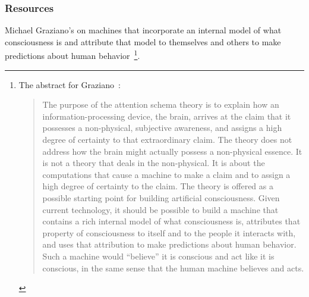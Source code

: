 

\subsubsection*{Resources}

Michael Graziano's {} on machines that incorporate an internal model of what consciousness is and attribute that model to themselves and others to make predictions about human behavior~\cite{GrazianoFiRAI-17}\footnote{%
%
  The abstract for Graziano~\cite{GrazianoFiRAI-17}:
%
  \begin{quotation}
%
   The purpose of the attention schema theory is to explain how an information-processing device, the brain, arrives at the claim that it possesses a non-physical, subjective awareness, and assigns a high degree of certainty to that extraordinary claim. The theory does not address how the brain might actually possess a non-physical essence. It is not a theory that deals in the non-physical. It is about the computations that cause a machine to make a claim and to assign a high degree of certainty to the claim. The theory is offered as a possible starting point for building artificial consciousness. Given current technology, it should be possible to build a machine that contains a rich internal model of what consciousness is, attributes that property of consciousness to itself and to the people it interacts with, and uses that attribution to make predictions about human behavior. Such a machine would “believe” it is conscious and act like it is conscious, in the same sense that the human machine believes and acts.
%
  \end{quotation}}.

